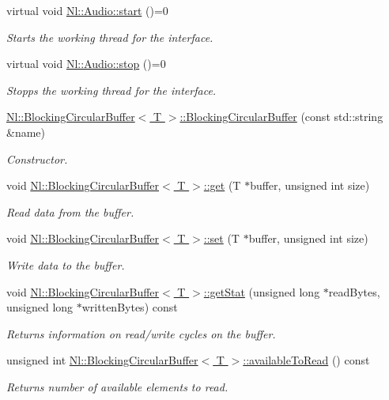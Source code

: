\begin{DoxyCompactItemize}
virtual void \hyperlink{group__Audio_ga7e3523ce7ad5dee987f931f7b68a4581}{Nl\-::\-Audio\-::start} ()=0
\begin{DoxyCompactList}\small\item\em Starts the working thread for the interface. \end{DoxyCompactList}\item 
virtual void \hyperlink{group__Audio_gaf84367ccd7daa7fc6c0bce2d9c7e2b14}{Nl\-::\-Audio\-::stop} ()=0
\begin{DoxyCompactList}\small\item\em Stopps the working thread for the interface. \end{DoxyCompactList}\item 
\hyperlink{group__Audio_gaff1f3f4ae609326ed19b4764a7516c32}{Nl\-::\-Blocking\-Circular\-Buffer$<$ T $>$\-::\-Blocking\-Circular\-Buffer} (const std\-::string \&name)
\begin{DoxyCompactList}\small\item\em Constructor. \end{DoxyCompactList}\item 
void \hyperlink{group__Audio_ga3923df13e2115ece2a5f4969a9b2f890}{Nl\-::\-Blocking\-Circular\-Buffer$<$ T $>$\-::get} (T $\ast$buffer, unsigned int size)
\begin{DoxyCompactList}\small\item\em Read data from the buffer. \end{DoxyCompactList}\item 
void \hyperlink{group__Audio_gab60ad480d2ebe4b2aa526d31d808be7a}{Nl\-::\-Blocking\-Circular\-Buffer$<$ T $>$\-::set} (T $\ast$buffer, unsigned int size)
\begin{DoxyCompactList}\small\item\em Write data to the buffer. \end{DoxyCompactList}\item 
void \hyperlink{group__Audio_ga012421a899e2da4cf994556ccfcb1880}{Nl\-::\-Blocking\-Circular\-Buffer$<$ T $>$\-::get\-Stat} (unsigned long $\ast$read\-Bytes, unsigned long $\ast$written\-Bytes) const 
\begin{DoxyCompactList}\small\item\em Returns information on read/write cycles on the buffer. \end{DoxyCompactList}\item 
unsigned int \hyperlink{group__Audio_ga75e3bbb71d5eeb19224f1503d58e1b0a}{Nl\-::\-Blocking\-Circular\-Buffer$<$ T $>$\-::available\-To\-Read} () const 
\begin{DoxyCompactList}\small\item\em Returns number of available elements to read. \end{DoxyCompactList}\item 

\end{DoxyCompactItemize}
